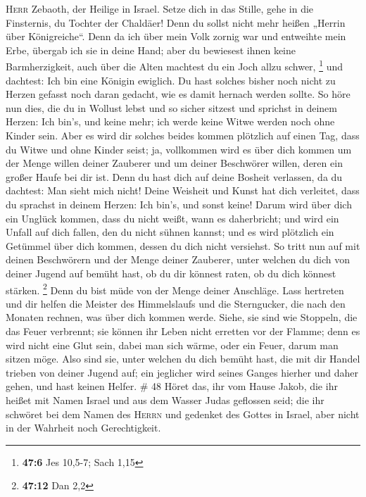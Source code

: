 \textsc{Herr} Zebaoth, der Heilige in Israel.  Setze dich
in das Stille, gehe in die Finsternis, du Tochter der Chaldäer! Denn du
sollst nicht mehr heißen „Herrin über Königreiche``.  Denn
da ich über mein Volk zornig war und entweihte mein Erbe, übergab ich
sie in deine Hand; aber du bewiesest ihnen keine Barmherzigkeit, auch
über die Alten machtest du ein Joch allzu schwer, \footnote{\textbf{47:6}
  Jes 10,5-7; Sach 1,15}  und dachtest: Ich bin eine
Königin ewiglich. Du hast solches bisher noch nicht zu Herzen gefasst
noch daran gedacht, wie es damit hernach werden sollte. 
So höre nun dies, die du in Wollust lebst und so sicher sitzest und
sprichst in deinem Herzen: Ich bin's, und keine mehr; ich werde keine
Witwe werden noch ohne Kinder sein.  Aber es wird dir
solches beides kommen plötzlich auf einen Tag, dass du Witwe und ohne
Kinder seist; ja, vollkommen wird es über dich kommen um der Menge
willen deiner Zauberer und um deiner Beschwörer willen, deren ein großer
Haufe bei dir ist.  Denn du hast dich auf deine Bosheit
verlassen, da du dachtest: Man sieht mich nicht! Deine Weisheit und
Kunst hat dich verleitet, dass du sprachst in deinem Herzen: Ich bin's,
und sonst keine!  Darum wird über dich ein Unglück
kommen, dass du nicht weißt, wann es daherbricht; und wird ein Unfall
auf dich fallen, den du nicht sühnen kannst; und es wird plötzlich ein
Getümmel über dich kommen, dessen du dich nicht versiehst.
 So tritt nun auf mit deinen Beschwörern und der Menge
deiner Zauberer, unter welchen du dich von deiner Jugend auf bemüht
hast, ob du dir könnest raten, ob du dich könnest stärken. \footnote{\textbf{47:12}
  Dan 2,2}  Denn du bist müde von der Menge deiner
Anschläge. Lass hertreten und dir helfen die Meister des Himmelslaufs
und die Sterngucker, die nach den Monaten rechnen, was über dich kommen
werde.  Siehe, sie sind wie Stoppeln, die das Feuer
verbrennt; sie können ihr Leben nicht erretten vor der Flamme; denn es
wird nicht eine Glut sein, dabei man sich wärme, oder ein Feuer, darum
man sitzen möge.  Also sind sie, unter welchen du dich
bemüht hast, die mit dir Handel trieben von deiner Jugend auf; ein
jeglicher wird seines Ganges hierher und daher gehen, und hast keinen
Helfer. \# 48  Höret das, ihr vom Hause Jakob, die ihr
heißet mit Namen Israel und aus dem Wasser Judas geflossen seid; die ihr
schwöret bei dem Namen des \textsc{Herrn} und gedenket des Gottes in
Israel, aber nicht in der Wahrheit noch Gerechtigkeit. 
